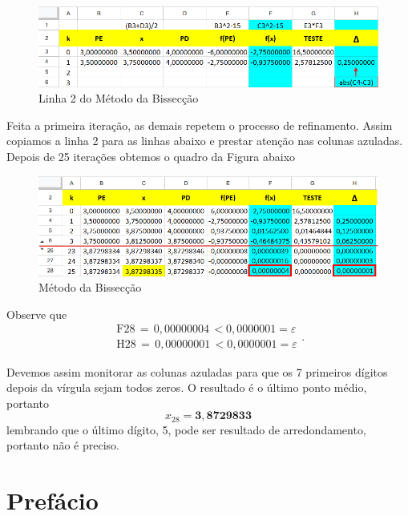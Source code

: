 \documentclass[
  letterpaper,
  DIV=11,
  numbers=noendperiod]{scrreprt}
\begin{document}
\begin{figure}[H]

{\centering \includegraphics{CabBis2b.png}

}

\caption{Linha 2 do Método da Bissecção}

\end{figure}%

Feita a primeira iteração, as demais repetem o processo de refinamento.
Assim copiamos a linha 2 para as linhas abaixo e prestar atenção nas
colunas azuladas. Depois de 25 iterações obtemos o quadro da Figura
abaixo

\begin{figure}[H]

{\centering \includegraphics{CabBis3.png}

}

\caption{Método da Bissecção}

\end{figure}%

Observe que \[\begin{array}{c}
\mbox{F}28\,=\,0,00000004\,<0,0000001=\varepsilon\\
\mbox{H}28\,=\,0,00000001\,<0,0000001=\varepsilon
\end{array}.\]

Devemos assim monitorar as colunas azuladas para que os 7 primeiros
dígitos depois da vírgula sejam todos zeros. O resultado é o último
ponto médio, portanto \[x_{28}=\boldsymbol{3,8729833}\] lembrando que o
último dígito, 5, pode ser resultado de arredondamento, portanto não é
preciso.


\chapter{Prefácio}\label{prefuxe1cio}
\end{document}
